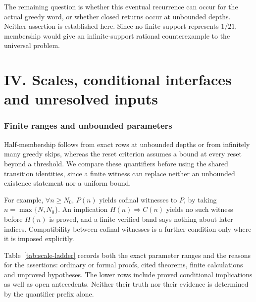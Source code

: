 The remaining question is whether this eventual recurrence can occur
for the actual greedy word, or whether closed returns occur at
unbounded depths. Neither assertion is established here. Since no
finite support represents $1/21$, membership would give an
infinite-support rational counterexample to the universal problem.

\clearpage
\part*{IV. Scales, conditional interfaces and unresolved inputs}
\section{Finite ranges and unbounded parameters}
\label{sec:scale-ladder}
Half-membership follows from exact rows at unbounded depths or from
infinitely many greedy skips, whereas the reset criterion assumes a
bound at every reset beyond a threshold. We compare these quantifiers
before using the shared transition identities, since a finite witness
can replace neither an unbounded existence statement nor a uniform
bound.

For example, $\forall n\ge N_0,\,P(n)$ yields cofinal witnesses to
$P$, by taking $n=\max\{N,N_0\}$. An implication
$H(n)\Rightarrow C(n)$ yields no such witness before $H(n)$ is proved,
and a finite verified band says nothing about later indices.
Compatibility between cofinal witnesses is a further condition only
where it is imposed explicitly.

Table~\ref{tab:scale-ladder} records both the exact parameter ranges and
the reasons for the assertions: ordinary or formal proofs, cited
theorems, finite calculations and unproved hypotheses. The lower rows
include proved conditional implications as well as open antecedents.
Neither their truth nor their evidence is determined by the quantifier
prefix alone.

